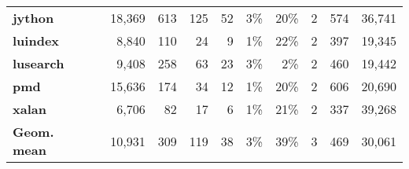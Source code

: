 \begin{table}
\begin{tabular}{@{}lrrrrrrrrr@{}}
\textbf{jython}                        & 18,369                  & 613                       & 125                             & 52                           & 3\%                                 & 20\%                                        & 2                                              & 574   & 36,741 \\
\textbf{luindex}                       & 8,840                   & 110                       & 24                              & 9                            & 1\%                                 & 22\%                                        & 2                                              & 397   & 19,345 \\
\textbf{lusearch}                      & 9,408                   & 258                       & 63                              & 23                           & 3\%                                 & 2\%                                         & 2                                              & 460   & 19,442 \\
\textbf{pmd}                           & 15,636                  & 174                       & 34                              & 12                           & 1\%                                 & 20\%                                        & 2                                              & 606   & 20,690 \\
\textbf{xalan}                         & 6,706                   & 82                        & 17                              & 6                            & 1\%                                 & 21\%                                        & 2                                              & 337   & 39,268 \\
\rowcolor[HTML]{EFEFEF} 
\textbf{Geom. mean}                    & \ 10,931                  & 309                       & 119                             & 38                           & 3\%                                 & 39\%                                        & 3                                              & 469   & 30,061 \\ \bottomrule
\end{tabular}

\end{table}